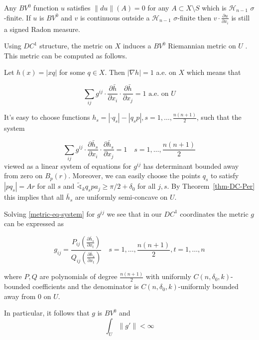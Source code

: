 \documentclass[12pt,leqno,intlimits]{amsart}
\numberwithin{equation}{section}
\theoremstyle{definition}
\theoremstyle{remark}
\begin{document}
Any $BV^0$ function $u$ satisfies $\|du\|(A)=0$ for any $A\subset X\setminus S$ which is $\mathcal H_{n-1}$  $\sigma$-finite. If $u$ is $BV^0$ and $v$ is continuous outside a $\mathcal H_{n-1}$  $\sigma$-finite then
$v\cdot\frac{\partial u}{\partial x_i}$ is still a signed Radon measure.

Using $DC^1$ structure, the metric on $X$ induces a $BV^0$ Riemannian metric on $U$ \cite{Per-DC}. This metric can be computed as follows.

Let $h(x)=|xq|$ for some $q\in X$. Then $|\nabla h|=1$ a.e. on $X$ which means that

\begin{equation*}\label{metric-eq-1}
\sum_{ij}g^{ij}\cdot \frac{\partial \bar h}{\partial x_i}\cdot \frac{\partial \bar h}{\partial x_j}= 1 \text{ a.e. on } U
\end{equation*}

It's easy to choose  functions $h_s=|\cdot q_s|-|q_sp|, s=1,\ldots,  \frac{n(n+1)}{2}$, such that the system

\begin{equation}\label{metric-eq-system}
\sum_{ij}g^{ij}\cdot \frac{\partial \bar h_s}{\partial x_i}\cdot \frac{\partial \bar h_s}{\partial x_j}= 1 \quad s=1,\ldots,  \frac{n(n+1)}{2}
\end{equation}
viewed as a linear system of equations for $g^{ij}$ has determinant bounded away from zero on $B_p(r)$. Moreover, we can easily choose the points $q_s$ to satisfy $|pq_s|=Ar$ for all $s$ and   $\tilde\sphericalangle_k q_spa_j\ge \pi/2+\delta_0$ for all $j,s$.
By Theorem~\ref{thm-DC-Per} this implies that all $\bar h_s$ are uniformly semi-concave on $U$.

Solving \eqref{metric-eq-system} for $g^{ij}$ we see that in our $DC^1$ coordinates the metric $g$ can be expressed as

\begin{equation}\label{metric}
g_{ij}=\frac{P_{ij}(\frac{\partial \bar h_s}{\partial x_t})}{Q_{ij}(\frac{\partial \bar h_s}{\partial x_t})}\quad s=1,\ldots, \frac{n(n+1)}{2},t=1,\ldots, n
\end{equation}

where %
 $P,Q$ are polynomials of degree $\frac{n(n+1)}{2}$ with uniformly $C(n,\delta_0,k)$-bounded coefficients and the denominator is $C(n,\delta_0,k)$-uniformly bounded away from $0$ on $U$.


In particular, it follows that $g$ is $BV^0$ and
\begin{equation}\label{g'-bounded}
\int_U\|g'\|<\infty
\end{equation}
\end{document}
